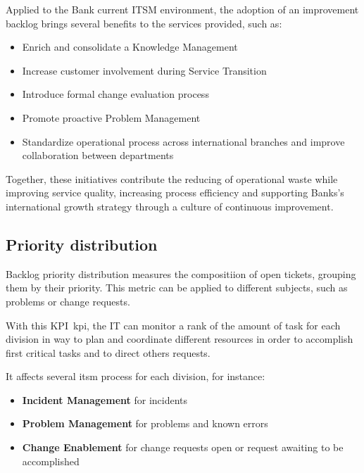 Applied to the Bank current ITSM environment, the adoption of an improvement backlog brings several benefits to the services provided, such as:

\begin{itemize}
    \item Enrich and consolidate a Knowledge Management
    \item Increase customer involvement during Service Transition
    \item Introduce formal change evaluation process 
    \item Promote proactive Problem Management
    \item Standardize operational process across international branches and improve collaboration between departments
\end{itemize}

Together, these initiatives contribute the reducing of operational waste while improving service quality, increasing process efficiency and supporting Banks's international growth strategy through a culture of continuous improvement.


\subsection{Priority distribution}
\label{sub:prioritydistribution}
Backlog priority distribution measures the compositiion of open tickets, grouping them by their priority. This metric can be applied to different subjects, such as problems or change requests.

With this KPI~\gls{kpi}, the IT can monitor a rank of the amount of task for each division in way to plan and coordinate different resources in order to accomplish first critical tasks and to direct others requests.

It affects several \gls{itsm} process for each division, for instance:

\begin{itemize}
    \item \textbf{Incident Management} for incidents 
    \item \textbf{Problem Management} for problems and known errors
    \item \textbf{Change Enablement} for change requests open or request awaiting to be accomplished
\end{itemize}

